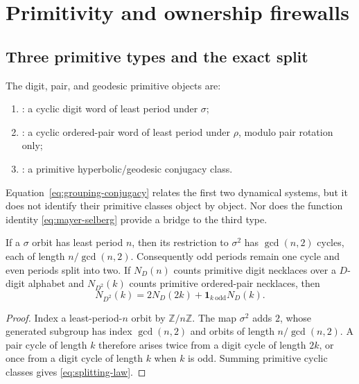 \section{Primitivity and ownership firewalls}
\label{sec:types}

\subsection{Three primitive types and the exact split}

The digit, pair, and geodesic primitive objects are:
\begin{enumerate}
  \item \SigmaPrimitive: a cyclic digit word of least period under $\sigma$;
  \item \RhoPrimitive: a cyclic ordered-pair word of least period under
  $\rho$, modulo pair rotation only;
  \item \GeoPrimitive: a primitive hyperbolic/geodesic conjugacy class.
\end{enumerate}
Equation~\eqref{eq:grouping-conjugacy} relates the first two dynamical
systems, but it does not identify their primitive classes object by object.
Nor does the function identity \eqref{eq:mayer-selberg} provide a bridge to
the third type.

\begin{proposition}
\label{prop:splitting}
If a $\sigma$ orbit has least period $n$, then its restriction to $\sigma^2$
has $\gcd(n,2)$ cycles, each of length $n/\gcd(n,2)$.  Consequently odd
periods remain one cycle and even periods split into two.  If $N_D(n)$ counts
primitive digit necklaces over a $D$-digit alphabet and $N_{D^2}(k)$ counts
primitive ordered-pair necklaces, then
\begin{equation}
  N_{D^2}(k)=2N_D(2k)+\mathbf1_{k\ \mathrm{odd}}N_D(k).
  \label{eq:splitting-law}
\end{equation}
\end{proposition}

\begin{proof}
Index a least-period-$n$ orbit by $\mathbb Z/n\mathbb Z$.  The map
$\sigma^2$ adds $2$, whose generated subgroup has index $\gcd(n,2)$ and
orbits of length $n/\gcd(n,2)$.  A pair cycle of length $k$ therefore arises
twice from a digit cycle of length $2k$, or once from a digit cycle of length
$k$ when $k$ is odd.  Summing primitive cyclic classes gives
\eqref{eq:splitting-law}.
\end{proof}

